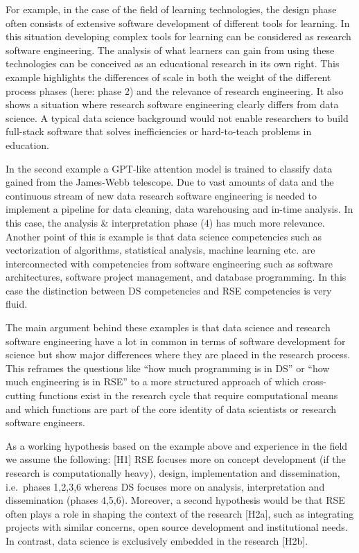 \documentclass[
        english,biblatex
    ]{lni}
\begin{document}
    For example, in the case of the field of learning technologies, the
    design phase often consists of extensive software development of
    different tools for learning. In this situation developing complex
    tools for learning can be considered as research software
    engineering. The analysis of what learners can gain from using these
    technologies can be conceived as an educational research in its own
    right. This example highlights the differences of scale in both the
    weight of the different process phases (here: phase 2) and the
    relevance of research engineering. It also shows a situation where
    research software engineering clearly differs from data science. A
    typical data science background would not enable researchers to
    build full-stack software that solves inefficiencies or
    hard-to-teach problems in education.

    In the second example a GPT-like attention model is trained to
    classify data gained from the James-Webb telescope. Due to vast
    amounts of data and the continuous stream of new data research
    software engineering is needed to implement a pipeline for data
    cleaning, data warehousing and in-time analysis. In this case, the
    analysis \& interpretation phase (4) has much more relevance.
    Another point of this is example is that data science competencies
    such as vectorization of algorithms, statistical analysis, machine
    learning etc. are interconnected with competencies from software
    engineering such as software architectures, software project
    management, and database programming. In this case the distinction
    between DS competencies and RSE competencies is very fluid.

    The main argument behind these examples is that data science and
    research software engineering have a lot in common in terms of
    software development for science but show major differences where
    they are placed in the research process. This reframes the questions
    like ``how much programming is in DS'' or ``how much engineering is
    in RSE'' to a more structured approach of which cross-cutting
    functions exist in the research cycle that require computational
    means and which functions are part of the core identity of data
    scientists or research software engineers.

    As a working hypothesis based on the example above and experience in
    the field we assume the following: {[}H1{]} RSE focuses more on
    concept development (if the research is computationally heavy),
    design, implementation and dissemination, i.e.~phases 1,2,3,6
    whereas DS focuses more on analysis, interpretation and
    dissemination (phases 4,5,6). Moreover, a second hypothesis would be
    that RSE often plays a role in shaping the context of the research
    {[}H2a{]}, such as integrating projects with similar concerns, open
    source development and institutional needs. In contrast, data
    science is exclusively embedded in the research {[}H2b{]}.
\end{document}
